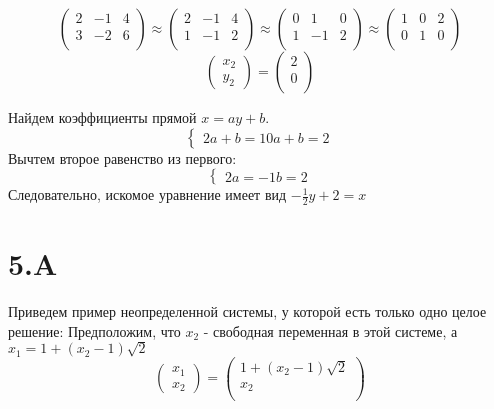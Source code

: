 \documentclass[a4paper]{article}
\begin{document}
\begin{equation*}
   \left(\begin{array}{rr|r}
   2 & -1 & 4\\ 
   3 & -2 & 6\\
   \end{array}\right)
\approx
   \left(\begin{array}{rr|r}
	2 & -1 & 4\\ 
   1 & -1 & 2\\
   \end{array}\right)
  \approx
     \left(\begin{array}{rr|r}
	0 & 1 & 0\\ 
   1 & -1 & 2\\
   \end{array}\right)
  \approx
       \left(\begin{array}{rr|r}
   1 & 0& 2\\ 
   0 & 1 & 0\\
   \end{array}\right)
\end{equation*}
\begin{equation*}
     \left(\begin{array}{rr|r}
   x_2\\
   y_2
   \end{array}\right)
  =
       \left(\begin{array}{rr|r}
    2\\ 
    0\\
   \end{array}\right)
\end{equation*}

Найдем коэффициенты прямой $x = ay + b$.
\begin{equation*}
\begin{cases}
2a + b = 1
0a + b = 2
\end{cases}
\end{equation*}
Вычтем второе равенство из первого:
\begin{equation*}
\begin{cases}
2a = -1
b = 2
\end{cases}
\end{equation*}
Следовательно, искомое уравнение имеет вид $-\frac{1}{2}y + 2 = x$


\section*{5.A}
Приведем пример неопределенной системы, у которой есть только одно целое решение: Предположим, что $x_2$ - свободная переменная в этой системе, а $x_1 = 1 + (x_2-1)\sqrt{2}$ 
\begin{equation*}
     \left(\begin{array}{r}
   x_1\\
   x_2
   \end{array}\right)
  =
       \left(\begin{array}{r}
    1 + (x_2-1)\sqrt{2}\\ 
    x_2\\
   \end{array}\right)
\end{equation*}
\end{document}
